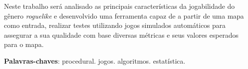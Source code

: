 \begin{resumo}
 Neste trabalho será analisado as principais características da jogabilidade do gênero \textit{roguelike} e desenvolvido uma ferramenta capaz de a partir de uma mapa como entrada, realizar testes utilizando jogos simulados automáticos para assegurar a sua qualidade com base diversas métricas e seus valores esperados para o mapa. 
 
 \begin{comment}
 
 Apesar de usarem tão fortemente conteúdos gerados proceduralmente, ainda hoje não é possível obter uma boa métrica de forma precisa quanto qualidade de seus mapas. Normalmente tendo a adequação dos seus mapas gerados através de muitos testes e apenas do sentimento obtido após muitas partidas.
 
 Não há nada de errado com esta forma, porém se houvesse uma ferramenta capaz de produzir métricas de análise para os mapas randômicamente gerados de forma relativamente rápida, isto poderia acelerar o processo de aperfeiçoamento dos algoritmos devido a redução em parte do tempo de testes. 
 
 Neste projeto, será desenvolvido um sistema capaz de obter um mapa e testa-lo através de uma série de métricas para assegurar a qualidade do mapa em relação a qualidade desejada. Na segunda parte do projeto será realizado uma analise comparativa para indicar se mapas proceduralmente gerados podem possuir metricas similares a mapas construidos manualmente e como usuários reais se sentem em relação as métricas obtidas, assegurando a confiança do sistema em seus resultados. 
\end{comment}
 \vspace{\onelineskip}
    
 \noindent
 \textbf{Palavras-chaves}: procedural. jogos. algoritmos. estatística.
\end{resumo}
